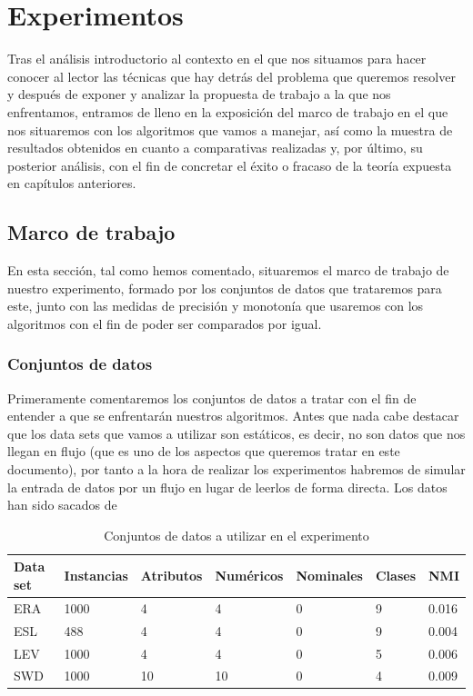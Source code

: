 \chapter[Capítulo 6. Experimentos]{Experimentos}

Tras el análisis introductorio al contexto en el que nos situamos para hacer conocer al lector las técnicas que hay detrás del problema que queremos resolver y después de exponer y analizar la propuesta de trabajo a la que nos enfrentamos, entramos de lleno en la exposición del marco de trabajo en el que nos situaremos con los algoritmos que vamos a manejar, así como la muestra de resultados obtenidos en cuanto a comparativas realizadas y, por último, su posterior análisis, con el fin de concretar el éxito o fracaso de la teoría expuesta en capítulos anteriores.

\section{Marco de trabajo}

En esta sección, tal como hemos comentado, situaremos el marco de trabajo de nuestro experimento, formado por los conjuntos de datos que trataremos para este, junto con las medidas de precisión y monotonía que usaremos con los algoritmos con el fin de poder ser comparados por igual.

\subsection{Conjuntos de datos}

Primeramente comentaremos los conjuntos de datos a tratar con el fin de entender a que se enfrentarán nuestros algoritmos. Antes que nada cabe destacar que los data sets que vamos a utilizar son estáticos, es decir, no son datos que nos llegan en flujo (que es uno de los aspectos que queremos tratar en este documento), por tanto a la hora de realizar los experimentos habremos de simular la entrada de datos por un flujo en lugar de leerlos de forma directa. Los datos han sido sacados de \cite{ref16}



\begin{table}[]
	\begin{tabular}{|l|l|l|l|l|l|l|}
		\hline
		Data set & Instancias & Atributos & Numéricos & Nominales & Clases & NMI   \\ \hline
		ERA      & 1000       & 4         & 4         & 0         & 9      & 0.016 \\ \hline
		ESL      & 488        & 4         & 4         & 0         & 9      & 0.004 \\ \hline
		LEV      & 1000       & 4         & 4         & 0         & 5      & 0.006 \\ \hline
		SWD      & 1000       & 10        & 10        & 0         & 4      & 0.009 \\ \hline
	\end{tabular}
	\caption{Conjuntos de datos a utilizar en el experimento}
\end{table}

